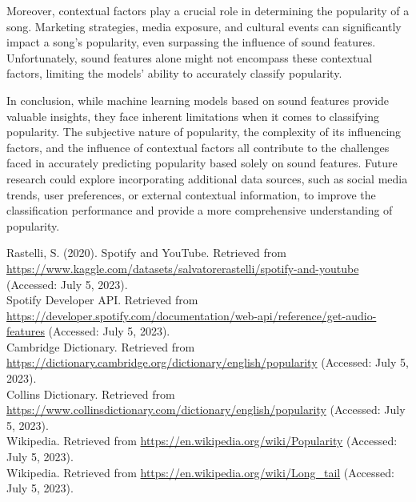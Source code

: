 \documentclass[11pt]{article} %
\begin{document}
Moreover, contextual factors play a crucial role in determining the popularity of a song. Marketing strategies, media exposure, and cultural events can significantly impact a song's popularity, even surpassing the influence of sound features. Unfortunately, sound features alone might not encompass these contextual factors, limiting the models' ability to accurately classify popularity.

In conclusion, while machine learning models based on sound features provide valuable insights, they face inherent limitations when it comes to classifying popularity. The subjective nature of popularity, the complexity of its influencing factors, and the influence of contextual factors all contribute to the challenges faced in accurately predicting popularity based solely on sound features. Future research could explore incorporating additional data sources, such as social media trends, user preferences, or external contextual information, to improve the classification performance and provide a more comprehensive understanding of popularity.

\newpage

\begin{thebibliography}{9}
	 Rastelli, S. (2020). Spotify and YouTube. Retrieved from \href{https://www.kaggle.com/datasets/salvatorerastelli/spotify-and-youtube}{https://www.kaggle.com/datasets/salvatorerastelli/spotify-and-youtube} (Accessed: July 5, 2023).\\
	 Spotify Developer API. Retrieved from \href{https://developer.spotify.com/documentation/web-api/reference/get-audio-features}{https://developer.spotify.com/documentation/web-api/reference/get-audio-features} (Accessed: July 5, 2023).\\
	 Cambridge Dictionary. Retrieved from \href{https://dictionary.cambridge.org/dictionary/english/popularity}{https://dictionary.cambridge.org/dictionary/english/popularity} (Accessed: July 5, 2023).\\
	 Collins Dictionary. Retrieved from \href{https://www.collinsdictionary.com/dictionary/english/popularity}{https://www.collinsdictionary.com/dictionary/english/popularity} (Accessed: July 5, 2023).\\
	 Wikipedia. Retrieved from \href{https://en.wikipedia.org/wiki/Popularity}{https://en.wikipedia.org/wiki/Popularity} (Accessed: July 5, 2023).\\
	 Wikipedia. Retrieved from \href{https://en.wikipedia.org/wiki/Long_tail}{https://en.wikipedia.org/wiki/Long\_tail} (Accessed: July 5, 2023).\\
\end{thebibliography}
\end{document}
